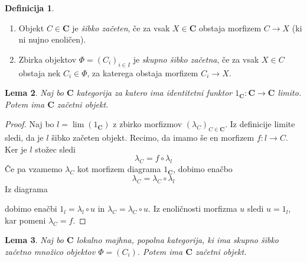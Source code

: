\documentclass[12pt,a4paper]{book}
\theoremstyle{definition}
\newtheorem{definicija}{Definicija}[chapter]
\theoremstyle{plain}
\newtheorem{lema}[definicija]{Lema}
\theoremstyle{definition}
\theoremstyle{remark}
\newcommand{\cat}[1]{\textbf{#1}}
\begin{document}
\begin{definicija}
\mbox{}
\begin{enumerate}[label=(\roman*)]
\item Objekt $C \in \cat{C}$ je \emph{šibko začeten}, če za vsak $X \in \cat{C}$ obstaja morfizem $C \to X$ (ki ni nujno enoličen).
\item Zbirka objektov $\Phi = (C_i)_{i \in I}$ je \emph{skupno šibko začetna}, če za vsak $X \in C$ obstaja nek $C_i \in \Phi$, za katerega obstaja morfizem $C_i \to X$.
\end{enumerate}
\end{definicija}
\begin{lema}
Naj bo $\cat{C}$ kategorija za katero ima identitetni funktor $1_\cat{C} : \cat{C} \to \cat{C}$ limito. Potem ima $\cat{C}$ začetni objekt.
\end{lema}
\begin{proof}
Naj bo $l = \lim (1_\cat{C})$ z zbirko morfizmov $(\lambda_C)_{C \in \cat{C}}$. Iz definicije limite sledi, da je $l$ šibko začeten objekt. Recimo, da imamo še en morfizem $f : l \to C$. Ker je $l$ stožec sledi
$$ \lambda_C  = f \circ \lambda_l$$
Če pa vzamemo $\lambda_C$ kot morfizem diagrama $1_\cat{C}$, dobimo enačbo
$$\lambda_C = \lambda_C \circ \lambda_l$$
Iz diagrama
\begin{center}
\end{center}
dobimo enačbi $1_l = \lambda_l \circ u$ in $\lambda_C = \lambda_C \circ u$. Iz enoličnosti morfizma $u$ sledi $u = 1_l$, kar pomeni $\lambda_C = f$.
\end{proof}
\begin{lema} \label{lema1}
Naj bo $\cat{C}$ lokalno majhna, popolna kategorija, ki ima skupno šibko začetno množico objektov $\Phi = (C_i)$. Potem ima $\cat{C}$ začetni objekt.
\end{lema}
\end{document}
